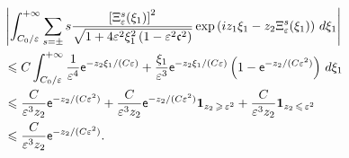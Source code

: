 \documentclass[10pt]{amsart}
\theoremstyle{definition}\newtheorem{defi}[theo]{Definition}\newtheorem{rema}[theo]{Remark}\newtheorem{exam}[theo]{Example}\newtheorem{exem}[theo]{Example}\newtheorem{nota}[theo]{Notation}
\newcommand{\bfun}{\mathbf{1}}
\newcommand*\ex{{\sf e}}
\newcommand*\cs{{\mathfrak c}}
\newcommand*\ii{\infty}
\newcommand*\gs{\geqslant }
\newcommand*\ls{\leqslant }
\newcommand*\e{\varepsilon}
\begin{document}
\begin{multline*}
\left\lvert \int_{C_0/ \e}^{+\ii}
\sum_{ s = \pm} s \frac{\left[\Xi_\e^s (\xi_1)\right]^2 }{\sqrt{1 + 4 \e^2 \xi_1^2 \left(1 - \e^2 \cs^2\right)}}
\exp\left(iz_1 \xi_1 - z_2 \Xi_\e^s (\xi_1)\right) \, d \xi_1 \right\rvert\\
\begin{aligned} 
& \ls C \int_{C_0/ \e}^{+\ii} \frac{1}{\e^4} \ex^{ - z_2 \xi_1/ (C\e) } + \frac{\xi_1}{\e^3} \ex^{ - z_2 \xi_1/ (C\e) } \left(1 - \ex^{ - z_2 / (C\e^2)}\right) \, d \xi_1
\\ & \ls
\frac{C}{ \e^3 z_2 } \ex^{ - z_2 / (C\e^2) } + \frac{C}{ \e^3 z_2 } \ex^{ - z_2 / (C\e^2) } \bfun_{z_2\, \gs\,\e^2 } + \frac{C}{ \e^3 z_2 } \bfun_{z_2\,\ls\,\e^2 }
\\ & \ls
\frac{C}{ \e^3 z_2 } \ex^{ - z_2 / (C\e^2) }.
\end{aligned}
\end{multline*}
\end{document}
